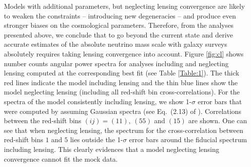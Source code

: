 Models with additional parameters, but neglecting lensing convergence are likely to weaken the constraints -- introducing new degeneracies -- and produce even stronger biases on the cosmological parameters. Therefore, from the analyses presented above, we conclude that to go beyond the current state and derive accurate estimates of the absolute neutrino mass scale with galaxy surveys absolutely requires taking lensing convergence into account. Figure \ref{fig:cl}   shows number counts angular power spectra for analyses including and neglecting lensing computed at the corresponding best fit (see Table \ref{Table:1}). The thick red lines indicate the model including lensing and the thin blue lines show the model neglecting lensing (including all red-shift bin cross-correlations). For the spectra of the model consistently including lensing, we show 1-$\sigma$ error bars that were computed by assuming Gaussian spectra (see Eq.~(2.13) of \cite{Montanari:2015rga}). Correlations between the red-shift bins $(ij)=(11), ~(55)$ and $(15)$ are shown. One can see that when neglecting lensing, the spectrum for the cross-correlation between red-shift bins $1$ and $5$ lies outside the 1-$\sigma$ error bars around the fiducial spectrum including lensing. This clearly evidences that a  model neglecting lensing convergence cannot fit the mock data.




